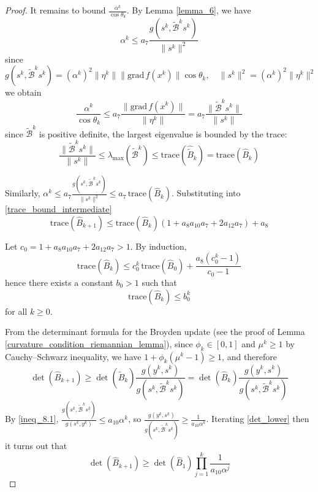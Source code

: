 \documentclass[12pt,a4paper,draft]{article}  %
\theoremstyle{definition}
\numberwithin{equation}{section}
\newcommand{\grad}{\mathrm{grad}\,}
\begin{document}
\begin{proof}
        It remains to bound $\frac{\alpha^k}{\cos\theta_k}$. By Lemma \ref{lemma_6}, we have $$\alpha^k \leq a_7\frac{g(s^k,\tilde{\mathcal{B}}^ks^k)}{\|s^k\|^2}$$ since 
        \[
        g(s^k, \tilde{\mathcal{B}}^ks^k) = (\alpha^k)^2\|\eta^k\|\|\grad f(x^k)\|\cos\theta_k, \quad \|s^k\|^2 = (\alpha^k)^2\|\eta^k\|^2
        \]
        we obtain
        \begin{equation}\label{alpha_cos_bound}
                \frac{\alpha^k}{\cos\theta_k} \leq a_7\frac{\|\grad f(x^k)\|}{\|\eta^k\|} = a_7\frac{\|\tilde{\mathcal{B}}^ks^k\|}{\|s^k\|}
        \end{equation}
        since $\tilde{\mathcal{B}}^k$ is positive definite, the largest eigenvalue is bounded by the trace:
        \[
        \frac{\|\tilde{\mathcal{B}}^ks^k\|}{\|s^k\|} \leq \lambda_{\max}(\tilde{\mathcal{B}}^k) \leq \mathrm{trace}(\hat{\tilde{B}}_k) = \mathrm{trace}(\hat{B}_k)
        \]

        Similarly, $\alpha^k \leq a_7\frac{g(s^k,\tilde{\mathcal{B}}^ks^k)}{\|s^k\|^2} \leq a_7\,\mathrm{trace}(\hat{B}_k)$. Substituting into \eqref{trace_bound_intermediate}
        \[
        \mathrm{trace}(\hat{B}_{k+1}) \leq \mathrm{trace}(\hat{B}_k)\left(1 + a_8 a_{10}a_7 + 2a_{12}a_7\right) + a_8
        \]

        Let $c_0 = 1 + a_8 a_{10}a_7 + 2a_{12}a_7 > 1$. By induction,
        \[
        \mathrm{trace}(\hat{B}_{k}) \leq c_0^k\,\mathrm{trace}(\hat{B}_0) + \frac{a_8(c_0^k - 1)}{c_0 - 1}
        \]
        hence there exists a constant $b_0>1$ such that
        \begin{equation}\label{trace_geometric_bound}
                \mathrm{trace}(\hat{B}_k) \leq b_0^k
        \end{equation}
        for all $k\geq 0$.

        From the determinant formula for the Broyden update (see the proof of Lemma \ref{curvature_condition_riemannian_lemma}), since $\phi_k\in [0,1]$ and $\mu^k\geq 1$ by Cauchy--Schwarz inequality, we have $1+\phi_k(\mu^k-1)\geq 1$, and therefore
        \begin{equation}\label{det_lower}
                \det(\hat{B}_{k+1}) \geq \det(\hat{\tilde{B}}_k)\frac{g(y^k,s^k)}{g(s^k,\tilde{\mathcal{B}}^ks^k)} = \det(\hat{B}_k)\frac{g(y^k,s^k)}{g(s^k,\tilde{\mathcal{B}}^ks^k)}
        \end{equation}
        By \eqref{ineq_8.1}, $\frac{g(s^k,\tilde{\mathcal{B}}^ks^k)}{g(s^k,y^k)}\leq a_{10}\alpha^k$, so $\frac{g(y^k,s^k)}{g(s^k,\tilde{\mathcal{B}}^ks^k)}\geq \frac{1}{a_{10}\alpha^k}$. Iterating \eqref{det_lower} then it turns out that
        \begin{equation}\label{det_iterated}
                \det(\hat{B}_{k+1}) \geq \det(\hat{B}_1)\prod_{j=1}^{k}\frac{1}{a_{10}\alpha^j}
        \end{equation}


\end{proof}
\end{document}
